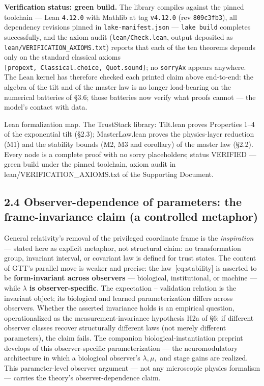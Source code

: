 \documentclass[
]{article}
\begin{document}
\textbf{Verification status: green build.} The library compiles against
the pinned toolchain --- Lean \texttt{4.12.0} with Mathlib at tag
\texttt{v4.12.0} (rev \texttt{809c3fb3}), all dependency revisions
pinned in \texttt{lake-manifest.json} --- \texttt{lake\ build} completes
successfully, and the axiom audit (\texttt{lean/Check.lean}, output
deposited as \texttt{lean/VERIFICATION\_AXIOMS.txt}) reports that each
of the ten theorems depends only on the standard classical axioms
\texttt{{[}propext,\ Classical.choice,\ Quot.sound{]}}; no
\texttt{sorryAx} appears anywhere. The Lean kernel has therefore checked
each printed claim above end-to-end: the algebra of the tilt and of the
master law is no longer load-bearing on the numerical batteries of §3.6;
those batteries now verify what proofs cannot --- the model's contact
with data.

Lean formalization map. The TrustStack library: Tilt.lean proves
Properties 1--4 of the exponential tilt (§2.3); MasterLaw.lean proves
the physics-layer reduction (M1) and the stability bounds (M2, M3 and
corollary) of the master law (§2.2). Every node is a complete proof with
no sorry placeholders; status VERIFIED --- green build under the pinned
toolchain, axiom audit in lean/VERIFICATION\_AXIOMS.txt of the
Supporting Document.

\subsection{2.4 Observer-dependence of parameters: the frame-invariance
claim (a controlled
metaphor)}\label{observer-dependence-of-parameters-the-frame-invariance-claim-a-controlled-metaphor}

General relativity's removal of the privileged coordinate frame is the
\emph{inspiration} --- stated here as explicit metaphor, not structural
claim: no transformation group, invariant interval, or covariant law is
defined for trust states. The content of GTT's parallel move is weaker
and precise: the law~{[}eq:stability{]} is asserted to be
\textbf{form-invariant across observers} --- biological, institutional,
or machine --- while \textbf{\(\lambda\) is observer-specific}. The
expectation -- validation relation is the invariant object; its
biological and learned parameterization differs across observers.
Whether the asserted invariance holds is an empirical question,
operationalized as the measurement-invariance hypothesis H2a of §6: if
different observer classes recover structurally different laws (not
merely different parameters), the claim fails. The companion
biological-instantiation preprint develops of this observer-specific
parameterization --- the neuromodulatory architecture in which a
biological observer's \(\lambda, \mu,\) and stage gains are realized.
This parameter-level observer argument --- not any microscopic physics
formalism --- carries the theory's observer-dependence claim.
\end{document}
